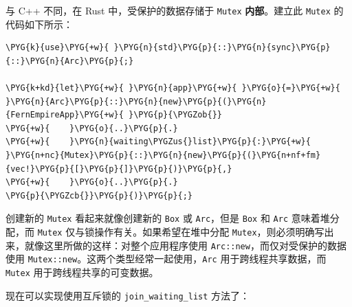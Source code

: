 与 C++ 不同，在 Rust 中，受保护的数据存储于 \texttt{Mutex} \textbf{内部}。建立此 \texttt{Mutex} 的代码如下所示：

\begin{Verbatim}[commandchars=\\\{\},breaklines=true,breakanywhere=true,fontsize=\codefont,xleftmargin=17bp]
\PYG{k}{use}\PYG{+w}{ }\PYG{n}{std}\PYG{p}{::}\PYG{n}{sync}\PYG{p}{::}\PYG{n}{Arc}\PYG{p}{;}

\PYG{k+kd}{let}\PYG{+w}{ }\PYG{n}{app}\PYG{+w}{ }\PYG{o}{=}\PYG{+w}{ }\PYG{n}{Arc}\PYG{p}{::}\PYG{n}{new}\PYG{p}{(}\PYG{n}{FernEmpireApp}\PYG{+w}{ }\PYG{p}{\PYGZob{}}
\PYG{+w}{    }\PYG{o}{..}\PYG{p}{.}
\PYG{+w}{    }\PYG{n}{waiting\PYGZus{}list}\PYG{p}{:}\PYG{+w}{ }\PYG{n+nc}{Mutex}\PYG{p}{::}\PYG{n}{new}\PYG{p}{(}\PYG{n+nf+fm}{vec!}\PYG{p}{[}\PYG{p}{]}\PYG{p}{)}\PYG{p}{,}
\PYG{+w}{    }\PYG{o}{..}\PYG{p}{.}
\PYG{p}{\PYGZcb{}}\PYG{p}{)}\PYG{p}{;}
\end{Verbatim}

创建新的 \texttt{Mutex} 看起来就像创建新的 \texttt{Box} 或 \texttt{Arc}，但是 \texttt{Box} 和 \texttt{Arc} 意味着堆分配，而 \texttt{Mutex} 仅与锁操作有关。如果希望在堆中分配 \texttt{Mutex}，则必须明确写出来，就像这里所做的这样：对整个应用程序使用 \texttt{Arc::new}，而仅对受保护的数据使用 \texttt{Mutex::new}。这两个类型经常一起使用，\texttt{Arc} 用于跨线程共享数据，而 \texttt{Mutex} 用于跨线程共享的可变数据。

现在可以实现使用互斥锁的 \texttt{join\_waiting\_list} 方法了：

